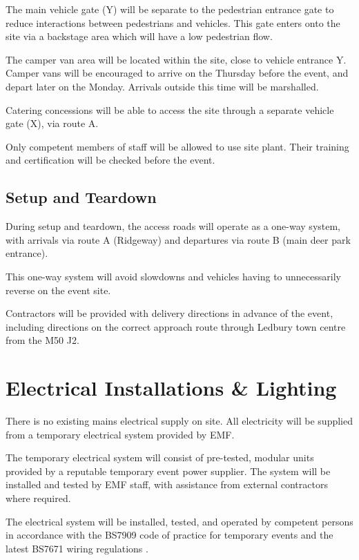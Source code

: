 The main vehicle gate (Y) will be separate to the pedestrian entrance gate
to reduce interactions between pedestrians and vehicles. This gate enters
onto the site via a backstage area which will have a low pedestrian flow.

The camper van area will be located within the site, close to vehicle
entrance Y. Camper vans will be encouraged to arrive on the Thursday before
the event, and depart later on the Monday. Arrivals outside this time will be
marshalled.

Catering concessions will be able to access the site through a separate
vehicle gate (X), via route A.

Only competent members of staff will be allowed to use site plant. Their
training and certification will be checked before the event.

\subsection{Setup and Teardown}
During setup and teardown, the access roads will operate as
a one-way system, with arrivals via route A (Ridgeway) and departures via
route B (main deer park entrance).

This one-way system will avoid slowdowns and vehicles having to unnecessarily
reverse on the event site.

Contractors will be provided with delivery directions in advance of the event,
including directions on the correct approach route through Ledbury town centre
from the M50 J2.

\section{Electrical Installations \& Lighting}\label{power}

There is no existing mains electrical supply on site. All electricity will be
supplied from a temporary electrical system provided by EMF.

The temporary electrical system will consist of pre-tested, modular units
provided by a reputable temporary event power supplier. The system will be
installed and tested by EMF staff, with assistance from external contractors
where required.

The electrical system will be installed, tested, and operated by competent
persons in accordance with the BS7909 code of practice for temporary events
\cite{bs7909} and the latest BS7671 wiring regulations \cite{bs7671}.

